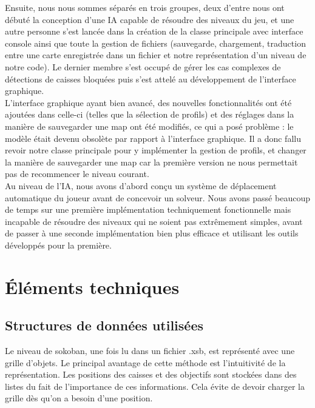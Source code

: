 \documentclass[a4paper,12pt]{article} %
\begin{document}
Ensuite, nous nous sommes séparés en trois groupes, deux d'entre nous ont débuté la conception d'une IA capable de résoudre des niveaux du jeu, et une autre personne s'est lancée dans la création de la classe principale avec interface console ainsi que toute la gestion de fichiers (sauvegarde, chargement, traduction entre une carte enregistrée dans un fichier et notre représentation d'un niveau de notre code). Le dernier membre s'est occupé de gérer les cas complexes de détections de caisses bloquées puis s'est attelé au développement de l'interface graphique.\\

L'interface graphique ayant bien avancé, des nouvelles fonctionnalités ont été ajoutées dans celle-ci (telles que la sélection de profils) et des réglages dans la manière de sauvegarder une map ont été modifiés, ce qui a posé problème : le modèle était devenu obsolète par rapport à l'interface graphique. Il a donc fallu revoir notre classe principale pour y implémenter la gestion de profils, et changer la manière de sauvegarder une map car la première version ne nous permettait pas de recommencer le niveau courant.\\

Au niveau de l'IA, nous avons d'abord conçu un système de déplacement automatique du joueur avant de concevoir un solveur. Nous avons passé beaucoup de temps sur une première implémentation techniquement fonctionnelle mais incapable de résoudre des niveaux qui ne soient pas extrêmement simples, avant de passer à une seconde implémentation bien plus efficace et utilisant les outils développés pour la première. 

\section{Éléments techniques}\label{et}

\subsection{Structures de données utilisées}

Le niveau de sokoban, une fois lu dans un fichier .xsb, est représenté avec une grille d'objets. Le principal avantage de cette méthode est l'intuitivité de la représentation.
Les positions des caisses et des objectifs sont stockées dans des listes du fait de l'importance de ces informations. Cela évite de devoir charger la grille dès qu'on a besoin d'une position.\\
\end{document}

